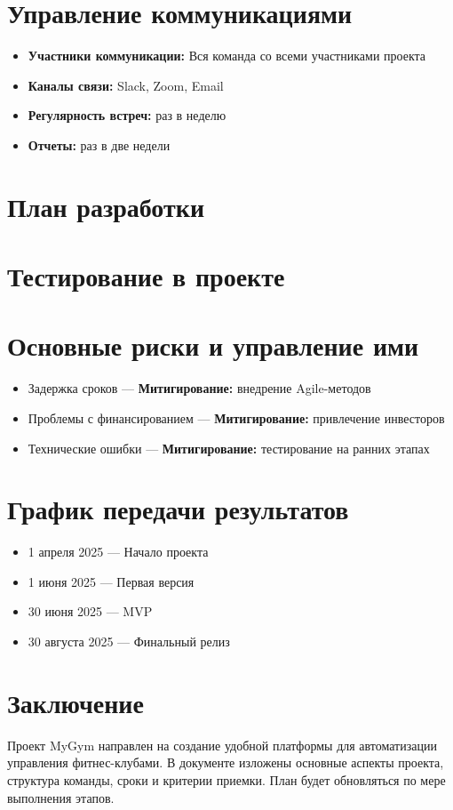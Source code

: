 \documentclass[14pt, russian]{matmex-diploma-custom}
\begin{document}
\section{Управление коммуникациями}
\begin{itemize}
\item \textbf{Участники коммуникации:} Вся команда со всеми участниками проекта
\item \textbf{Каналы связи:} Slack, Zoom, Email
\item \textbf{Регулярность встреч:} раз в неделю
\item \textbf{Отчеты:} раз в две недели
\end{itemize}

\section{План разработки}

\section{Тестирование в проекте}

\section{Основные риски и управление ими}
\begin{itemize}
\item Задержка сроков --- \textbf{Митигирование:} внедрение Agile-методов
\item Проблемы с финансированием --- \textbf{Митигирование:} привлечение инвесторов
\item Технические ошибки --- \textbf{Митигирование:} тестирование на ранних этапах
\end{itemize}

\section{График передачи результатов}
\begin{itemize}
\item 1 апреля 2025 --- Начало проекта
\item 1 июня 2025 --- Первая версия
\item 30 июня 2025 --- MVP
\item 30 августа 2025 --- Финальный релиз
\end{itemize}


\section{Заключение}
Проект MyGym направлен на создание удобной платформы для автоматизации управления фитнес-клубами. В документе изложены основные аспекты проекта, структура команды, сроки и критерии приемки. План будет обновляться по мере выполнения этапов.
\end{document}

